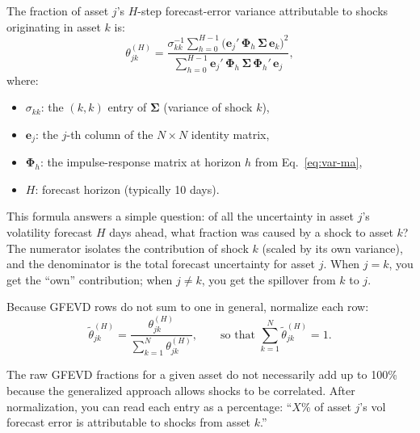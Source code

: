 \begin{definition}
The fraction of asset $j$'s $H$-step forecast-error variance attributable to
shocks originating in asset $k$ is:
\begin{equation}\label{eq:gfevd}
  \theta_{jk}^{(H)}
  = \frac{
      \sigma_{kk}^{-1} \sum_{h=0}^{H-1}
        \bigl(\bm{e}_j' \, \bm{\Phi}_h \, \bm{\Sigma} \, \bm{e}_k \bigr)^2
    }{
      \sum_{h=0}^{H-1}
        \bm{e}_j' \, \bm{\Phi}_h \, \bm{\Sigma} \, \bm{\Phi}_h' \, \bm{e}_j
    },
\end{equation}
where:
\begin{itemize}[nosep]
  \item $\sigma_{kk}$: the $(k,k)$ entry of $\bm{\Sigma}$ (variance of shock $k$),
  \item $\bm{e}_j$: the $j$-th column of the $N \times N$ identity matrix,
  \item $\bm{\Phi}_h$: the impulse-response matrix at horizon $h$ from Eq.~\eqref{eq:var-ma},
  \item $H$: forecast horizon (typically 10 days).
\end{itemize}
\end{definition}

\begin{intuition}
This formula answers a simple question: of all the uncertainty in asset $j$'s
volatility forecast $H$ days ahead, what fraction was caused by a shock to asset $k$?
The numerator isolates the contribution of shock $k$ (scaled by its own variance),
and the denominator is the total forecast uncertainty for asset $j$.  When $j = k$,
you get the ``own'' contribution; when $j \neq k$, you get the spillover from $k$
to $j$.
\end{intuition}

Because GFEVD rows do not sum to one in general, normalize each row:
\begin{equation}\label{eq:gfevd-norm}
  \widetilde{\theta}_{jk}^{(H)}
  = \frac{\theta_{jk}^{(H)}}{\sum_{k=1}^{N} \theta_{jk}^{(H)}},
  \qquad \text{so that } \sum_{k=1}^{N} \widetilde{\theta}_{jk}^{(H)} = 1.
\end{equation}

\begin{intuition}
The raw GFEVD fractions for a given asset do not necessarily add up to 100\% because
the generalized approach allows shocks to be correlated.  After normalization, you can read each entry as a percentage: ``$X$\% of asset
$j$'s vol forecast error is attributable to shocks from asset $k$.''
\end{intuition}

